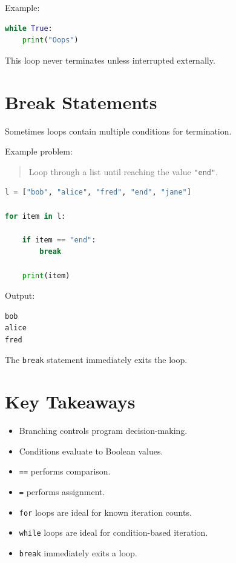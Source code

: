 \documentclass[11pt]{article}
\begin{document}
Example:

\begin{lstlisting}[language=Python]
while True:
    print("Oops")
\end{lstlisting}

This loop never terminates unless interrupted externally.

\section{Break Statements}

Sometimes loops contain multiple conditions for termination.

Example problem:

\begin{quote}
Loop through a list until reaching the value \texttt{"end"}.
\end{quote}

\begin{lstlisting}[language=Python]
l = ["bob", "alice", "fred", "end", "jane"]

for item in l:

    if item == "end":
        break

    print(item)
\end{lstlisting}

Output:

\begin{lstlisting}
bob
alice
fred
\end{lstlisting}

The \verb|break| statement immediately exits the loop.

\section{Key Takeaways}

\begin{itemize}
    \item Branching controls program decision-making.

    \item Conditions evaluate to Boolean values.

    \item \verb|==| performs comparison.

    \item \verb|=| performs assignment.

    \item \verb|for| loops are ideal for known iteration counts.

    \item \verb|while| loops are ideal for condition-based iteration.

    \item \verb|break| immediately exits a loop.
\end{itemize}
\end{document}
